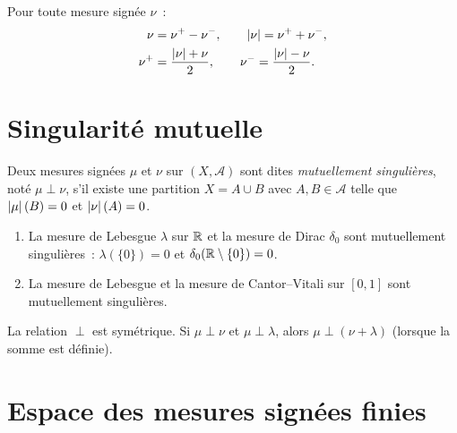 \begin{formules}[title=\textbf{R\'esum\'e~: d\'ecomposition de Jordan}]
Pour toute mesure sign\'ee $\nu$~:
\begin{align*}
    \nu &= \nu^+ - \nu^-, \qquad \left| \nu \right| = \nu^+ + \nu^-, \\
    \nu^+ &= \frac{\left| \nu \right| + \nu}{2}, \qquad
    \nu^- = \frac{\left| \nu \right| - \nu}{2}.
\end{align*}
\end{formules}

\section{Singularit\'e mutuelle}

\begin{definition}
\label{def:singuliere}
Deux mesures sign\'ees $\mu$ et $\nu$ sur $(X, \mathcal{A})$ sont dites
\emph{mutuellement singuli\`eres}, not\'e
$\mu \perp \nu$, s'il existe une partition $X = A \cup B$ avec
$A, B \in \mathcal{A}$ telle que $\left| \mu \right|(B) = 0$ et $\left| \nu \right|(A) = 0$.
\end{definition}

\begin{exemple}
\begin{enumerate}
    \item La mesure de Lebesgue $\lambda$ sur $\mathbb{R}$ et la mesure de Dirac
    $\delta_0$ sont mutuellement singuli\`eres~: $\lambda(\{0\}) = 0$ et
    $\delta_0(\mathbb{R} \setminus \{0\}) = 0$.
    \item La mesure de Lebesgue et la mesure de Cantor--Vitali sur $[0,1]$
    sont mutuellement singuli\`eres.
\end{enumerate}
\end{exemple}

\begin{proposition}
La relation $\perp$ est sym\'etrique. Si $\mu \perp \nu$ et $\mu \perp \lambda$,
alors $\mu \perp (\nu + \lambda)$ (lorsque la somme est d\'efinie).
\end{proposition}

\section{Espace des mesures sign\'ees finies}

